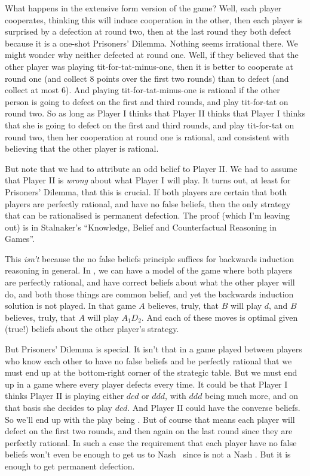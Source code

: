 What happens in the extensive form version of the game? Well, each player cooperates, thinking this will induce cooperation in the other, then each player is surprised by a defection at round two, then at the last round they both defect because it is a one-shot Prisoners' Dilemma. Nothing seems irrational there. We might wonder why neither defected at round one. Well, if they believed that the other player was playing tit-for-tat-minus-one, then it is better to cooperate at round one (and collect 8 points over the first two rounds) than to defect (and collect at most 6). And playing tit-for-tat-minus-one is rational if the other person is going to defect on the first and third rounds, and play tit-for-tat on round two. So as long as Player I thinks that Player II thinks that Player I thinks that she is going to defect on the first and third rounds, and play tit-for-tat on round two, then her cooperation at round one is rational, and consistent with believing that the other player is rational.

But note that we had to attribute an odd belief to Player II. We had to assume that Player II is \textit{wrong} about what Player I will play. It turns out, at least for Prisoners' Dilemma, that this is crucial. If both players are certain that both players are perfectly rational, and have no false beliefs, then the only strategy that can be rationalised is permanent defection. The proof (which I'm leaving out) is in Stalnaker's ``Knowledge, Belief and Counterfactual Reasoning in Games''.

This \textit{isn't} because the no false beliefs principle suffices for backwards induction reasoning in general. In , we can have a model of the game where both players are perfectly rational, and have correct beliefs about what the other player will do, and both those things are common belief, and yet the backwards induction solution is not played. In that game $A$ believes, truly, that $B$ will play $d$, and $B$ believes, truly, that $A$ will play $A_1D_2$. And each of these moves is optimal given (true!) beliefs about the other player's strategy.

But Prisoners' Dilemma is special. It isn't that in a game played between players who know each other to have no false beliefs and be perfectly rational that we must end up at the bottom-right corner of the strategic table. But we must end up in a game where every player defects every time. It could be that Player I thinks Player II is playing either $dcd$ or $ddd$, with $ddd$ being much more, and on that basis  she decides to play $dcd$. And Player II could have the converse beliefs. So we'll end up with the play being . But of course that means each player will defect on the first two rounds, and then again on the last round since they are perfectly rational. In such a case the requirement that each player have no false beliefs won't even be enough to get us to Nash \eqm\, since  is not a Nash \eqm. But it is enough to get permanent defection.


